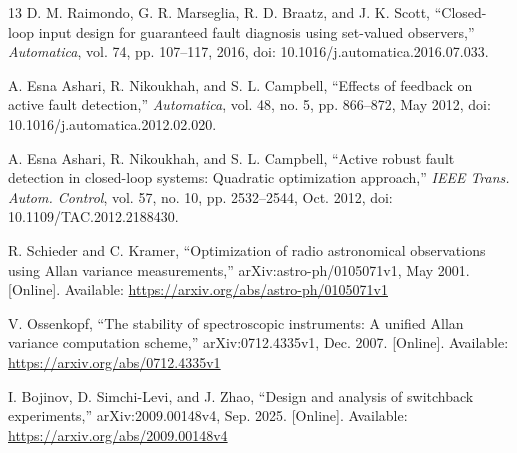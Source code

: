 \documentclass[journal]{IEEEtran}
\begin{document}
\begin{thebibliography}{13}
D. M. Raimondo, G. R. Marseglia, R. D. Braatz, and J. K. Scott,
``Closed-loop input design for guaranteed fault diagnosis using set-valued
observers,'' \emph{Automatica}, vol. 74, pp. 107--117, 2016,
doi: 10.1016/j.automatica.2016.07.033.

A. Esna Ashari, R. Nikoukhah, and S. L. Campbell,
``Effects of feedback on active fault detection,'' \emph{Automatica},
vol. 48, no. 5, pp. 866--872, May 2012,
doi: 10.1016/j.automatica.2012.02.020.

A. Esna Ashari, R. Nikoukhah, and S. L. Campbell,
``Active robust fault detection in closed-loop systems: Quadratic optimization
approach,'' \emph{IEEE Trans. Autom. Control}, vol. 57, no. 10,
pp. 2532--2544, Oct. 2012, doi: 10.1109/TAC.2012.2188430.

R. Schieder and C. Kramer,
``Optimization of radio astronomical observations using Allan variance measurements,''
arXiv:astro-ph/0105071v1, May 2001.
[Online]. Available: \url{https://arxiv.org/abs/astro-ph/0105071v1}

V. Ossenkopf,
``The stability of spectroscopic instruments: A unified Allan variance computation scheme,''
arXiv:0712.4335v1, Dec. 2007.
[Online]. Available: \url{https://arxiv.org/abs/0712.4335v1}

I. Bojinov, D. Simchi-Levi, and J. Zhao,
``Design and analysis of switchback experiments,''
arXiv:2009.00148v4, Sep. 2025.
[Online]. Available: \url{https://arxiv.org/abs/2009.00148v4}

\end{thebibliography}
\end{document}
